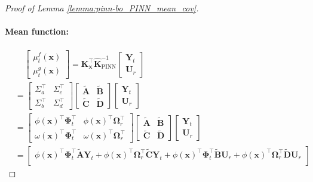 \begin{proof} [Proof of Lemma \ref{lemma:pinn-bo_PINN_mean_cov}]
\paragraph{Mean function:}
\begin{align*}
    &\;\;\;\; \begin{bmatrix}
        \mu_t^f(\mathbf{x})\\
        \mu_t^g(\mathbf{x}) 
    \end{bmatrix} = \mathbf{K}_\mathbf{x} ^\top \mathbf{\widehat{K}}_\mathrm{PINN}^{-1} \begin{bmatrix}
        \mathbf{Y}_t \\
        \mathbf{U}_r
    \end{bmatrix}
    \\
    &= \begin{bmatrix}
        \Sigma_a^\top & \Sigma_c^\top \\
        \Sigma_b^\top & \Sigma_d^\top
    \end{bmatrix} \begin{bmatrix}
        \widetilde{\mathbf{A}} & \widetilde{\mathbf{B}} \\
    \widetilde{\mathbf{C}} & \widetilde{\mathbf{D}}
    \end{bmatrix} \begin{bmatrix}
        \mathbf{Y}_t \\
        \mathbf{U}_r
    \end{bmatrix}\\
    &= \begin{bmatrix}
        \phi(\mathbf{x})^\top \boldsymbol{\Phi}_t^\top &  \phi(\mathbf{x})^\top \boldsymbol{\Omega}_r ^\top \\
        \omega(\mathbf{x})^\top \boldsymbol{\Phi}_t^\top  & \omega(\mathbf{x})^\top \boldsymbol{\Omega}_r ^\top
    \end{bmatrix} \begin{bmatrix}
        \widetilde{\mathbf{A}} & \widetilde{\mathbf{B}} \\
    \widetilde{\mathbf{C}} & \widetilde{\mathbf{D}}
    \end{bmatrix} \begin{bmatrix}
        \mathbf{Y}_t \\
        \mathbf{U}_r
    \end{bmatrix} \\
    & = \begin{bmatrix}
         \phi(\mathbf{x})^\top \boldsymbol{\Phi}_t^\top \widetilde{\mathbf{A}}\mathbf{Y}_t +  \phi(\mathbf{x})^\top \boldsymbol{\Omega}_r ^\top  \widetilde{\mathbf{C}}\mathbf{Y}_t  + \phi(\mathbf{x})^\top \boldsymbol{\Phi}_t^\top \widetilde{\mathbf{B}} \mathbf{U}_r   +  \phi(\mathbf{x})^\top \boldsymbol{\Omega}_r ^\top  \widetilde{\mathbf{D}} \mathbf{U}_r \\

\end{bmatrix}
\end{align*}
\end{proof}
